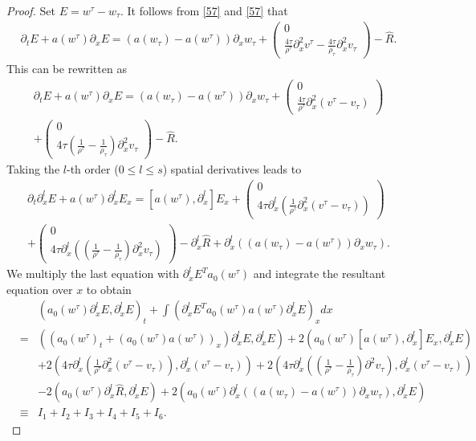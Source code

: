 \documentclass{article}
\theoremstyle{plain}
\begin{document}
\begin{proof}
Set $E = w^\tau - w_\tau$. It follows from \eqref{57} and \eqref{57} that
\begin{eqnarray*}
  \partial_t E + a(w^\tau) \partial_x E = (a(w_\tau) - a(w^\tau)) \partial_x w_\tau + \left( \begin{array}{cc} 0 \\ \frac{4\tau}{\rho^\tau} \partial^2_x v^\tau - \frac{4\tau}{\rho_\tau} \partial^2_x v_\tau \end{array} \right) - \hat{R}.
\end{eqnarray*}
This can be rewritten as
\begin{eqnarray*}
   \partial_t E + a(w^\tau) \partial_x E = (a(w_\tau) - a(w^\tau)) \partial_x w_\tau + \left( \begin{array}{cc} 0 \\ \frac{4\tau}{\rho^\tau} \partial^2_x (v^\tau - v_\tau) \end{array} \right) \\
   + \left( \begin{array}{cc} 0 \\ 4\tau(\frac{1}{\rho^\tau} -\frac{1}{ \rho_\tau})\partial^2_x v_\tau \end{array} \right)- \hat{R}.
\end{eqnarray*}
Taking the $l$-th order ($0 \le l \le s$) spatial derivatives leads to
\begin{eqnarray*}
  \partial_t \partial^l_x E + a(w^\tau) \partial^l_x E_x  = [a(w^\tau),\partial^l_x] E_x  + \left( \begin{array}{cc} 0 \\4\tau \partial^l_x(\frac{1}{\rho^\tau} \partial^2_x (v^\tau-v_\tau)) \end{array} \right) \\  + \left( \begin{array}{cc} 0 \\ 4 \tau \partial^l_x ((\frac{1}{\rho^\tau} - \frac{1}{\rho_\tau}) \partial^2_x v_\tau) \end{array} \right) -\partial^l_x \hat{R} + \partial^l_x ((a(w_\tau)-a(w^\tau))\partial_x w_\tau).
\end{eqnarray*}
We multiply the last equation with $\partial^l_x E^Ta_0(w^\tau)$ and integrate the resultant equation over $x$ to obtain
\begin{eqnarray}\label{58}
&& (a_0(w^\tau) \partial^l_x E,\partial^l_x E)_t + \int ( \partial^l_x E^T a_0(w^\tau) a(w^\tau) \partial^l_x E )_x dx \nonumber \\
&=&  ((a_0(w^\tau)_t + (a_0(w^\tau)a(w^\tau))_x) \partial^l_x E,\partial^l_x E)
+ 2(a_0(w^\tau)[a(w^\tau),\partial^l_x] E_x,\partial^l_x E)\nonumber \\
&& + 2 (4\tau \partial^l_x (\frac{1}{\rho^\tau} \partial^2_x (v^\tau-v_\tau)),\partial^l_x (v^\tau-v_\tau)) + 2(4\tau \partial^l_x ( (\frac{1}{\rho^\tau}-\frac{1}{\rho_\tau})\partial^2 v_\tau),\partial^l_x (v^\tau-v_\tau)) \nonumber\\
&& - 2(a_0(w^\tau)\partial^l_x\hat{R},\partial^l_x E)+ 2(a_0(w^\tau)\partial^l_x((a(w_\tau)-a(w^\tau))\partial_x w_\tau),\partial^l_x E) \nonumber \\
& \equiv& I_1 +I_2 +I_3 +I_4+I_5 + I_6.
\end{eqnarray}


\end{proof}
\end{document}
